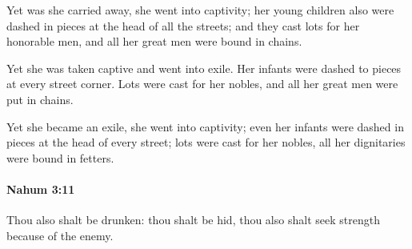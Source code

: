 			\begin{versebox}
					\item[BHS] 
					\item[LXX] 
					\item[ASV] Yet was she carried away, she went into captivity; her young children also were dashed in pieces at the head of all the streets; and they cast lots for her honorable men, and all her great men were bound in chains.
					\item[NIV] Yet she was taken captive and went into exile. Her infants were dashed to pieces at every street corner. Lots were cast for her nobles, and all her great men were put in chains.
					\item[NRSV] Yet she became an exile, she went into captivity; even her infants were dashed in pieces at the head of every street; lots were cast for her nobles, all her dignitaries were bound in fetters.
			\end{versebox}

		\paragraph{Nahum 3:11} %
			\label{NAHUM-3-11}

			Thou also shalt be drunken: thou shalt be hid, thou also shalt seek strength because of the enemy.

